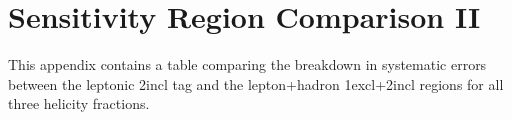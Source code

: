 \clearpage
\section{Sensitivity Region Comparison II}
\label{app:systTables_regionComp}
This appendix contains a table comparing the breakdown in systematic errors between the leptonic 2incl \bt tag and the lepton+hadron 1excl+2incl regions for all three helicity fractions. 

